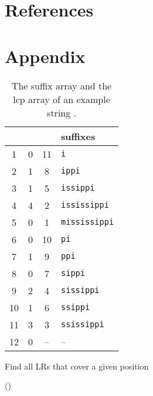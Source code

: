 \documentclass[preprint]{elsarticle}
\begin{document}
 
\section*{References}

\small 






\newpage

\appendix 




\section*{Appendix}

\begin{table}[h!]
\center
\def\0{\phantom{0}}
{\footnotesize
\begin{tabular}{c|c|c|l}
\hline 
 &   &  & suffixes\\
\hline
\hline
\01 & 0 & 11\0  &{\tt i}\\
\02 & 1 & \08\0  & {\tt  ippi}\\
\03 & 1 & \05\0  & {\tt  issippi}\\
\04 & 4 & \02\0  & {\tt  ississippi}\\
\05 & 0 & \01\0  & {\tt  mississippi}\\
\06 & 0 & 10\0  & {\tt  pi}\\
\07 & 1 &  \09\0  & {\tt ppi}\\
\08 & 0 & \07\0  & {\tt sippi}\\
\09 & 2  & \04\0  & {\tt sissippi}\\
10 & 1  & \06\0  & {\tt ssippi}\\
11 & 3 & \03\0  & {\tt ssissippi}\\
12 & 0 & -- & --\\
\hline
\end{tabular}
}
\bigskip
\caption{The suffix array and the lcp array of an example string .}
\label{tab:suflcp}
\end{table}


\begin{algorithm}[h!]
{\small
  \caption{Find all LRs that cover a given position }
\label{algo:one-all}

\smallskip 

\;


\smallskip 


\If(){}{
}
}\end{algorithm}
\end{document}
